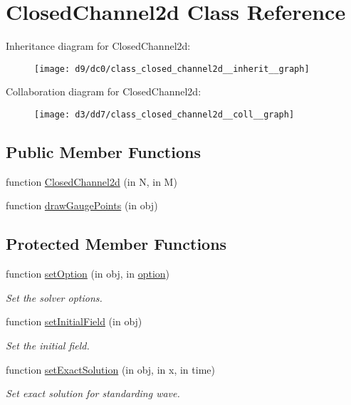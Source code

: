\hypertarget{class_closed_channel2d}{}\section{Closed\+Channel2d Class Reference}
\label{class_closed_channel2d}


Inheritance diagram for Closed\+Channel2d\+:
\nopagebreak
\begin{figure}[H]
\begin{center}
\leavevmode
\texttt{[image: d9/dc0/class\_closed\_channel2d\_\_inherit\_\_graph]}
\end{center}
\end{figure}


Collaboration diagram for Closed\+Channel2d\+:
\nopagebreak
\begin{figure}[H]
\begin{center}
\leavevmode
\texttt{[image: d3/dd7/class\_closed\_channel2d\_\_coll\_\_graph]}
\end{center}
\end{figure}
\subsection*{Public Member Functions}
\begin{DoxyCompactItemize}
\item 
function \hyperlink{class_closed_channel2d_afa7d87d1649a27ebb167c2e7abe7acce}{Closed\+Channel2d} (in N, in M)
\item 
function \hyperlink{class_closed_channel2d_a9335a521f26996c441502d2e108b3776}{draw\+Gauge\+Points} (in obj)
\end{DoxyCompactItemize}
\subsection*{Protected Member Functions}
\begin{DoxyCompactItemize}
\item 
function \hyperlink{class_closed_channel2d_aae73281d675dd1095fccdf784d62e4ad}{set\+Option} (in obj, in \hyperlink{class_ndg_phys_af91f4c54b93504e76b38a5693774dff1}{option})
\begin{DoxyCompactList}\small\item\em Set the solver options. \end{DoxyCompactList}\item 
function \hyperlink{class_closed_channel2d_a54f595d858c67d5b5ef90fa5481d9a37}{set\+Initial\+Field} (in obj)
\begin{DoxyCompactList}\small\item\em Set the initial field. \end{DoxyCompactList}\item 
function \hyperlink{class_closed_channel2d_a67b1a67df5ce6d94beed608b673794b4}{set\+Exact\+Solution} (in obj, in x, in time)
\begin{DoxyCompactList}\small\item\em Set exact solution for standarding wave. \end{DoxyCompactList}\end{DoxyCompactItemize}
